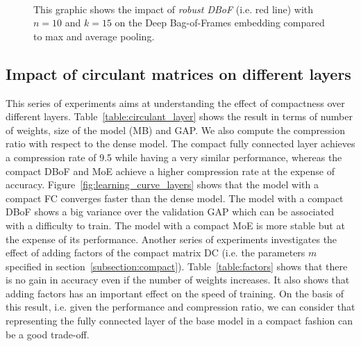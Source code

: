 \documentclass[runningheads]{llncs}
\begin{document}
\begin{figure}[!htb]
  \centering
  \\[-0.3cm]
  \setlength{\belowcaptionskip}{-0.4cm}
  \caption{This graphic shows the impact of \textit{robust DBoF} (i.e. red line) with $n=10$ and $k=15$ on the Deep Bag-of-Frames embedding compared to max and average pooling.}
  \label{fig:learning_curve_bagging}
\end{figure}

\subsection{Impact of circulant matrices on different layers}
This series of experiments aims at understanding the effect of compactness over different layers. Table~\ref{table:circulant_layer} shows the result in terms of number of weights, size of the model (MB) and GAP. We also compute the compression ratio with respect to the dense model. The compact fully connected layer achieves a compression rate of 9.5 while having a very similar performance, whereas the compact DBoF and MoE achieve a higher compression rate at the expense of accuracy.
Figure~\ref{fig:learning_curve_layers} shows that the model with a compact FC converges faster than the dense model. The model with a compact DBoF shows a big variance over the validation GAP which can be associated with a difficulty to train. The model with a compact MoE is more stable but at the expense of its performance.
Another series of experiments investigates the effect of adding factors of the compact matrix DC (i.e. the parameters $m$ specified in section~\ref{subsection:compact}). Table~\ref{table:factors} shows that there is no gain in accuracy even if the number of weights increases. It also shows that adding factors has an important effect on the  speed of training. On the basis of this result, i.e. given the performance and compression ratio, we can consider that representing the fully connected layer of the base model in a compact fashion can be a good trade-off.
\end{document}
